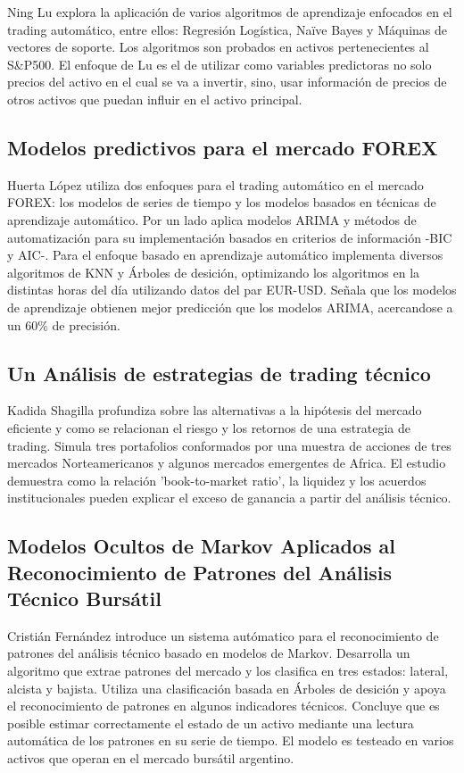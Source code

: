 \documentclass[a4paper,12pt]{Latex/Classes/PhDthesisPSnPDF}
\begin{document}
Ning Lu explora la aplicación de varios algoritmos de aprendizaje enfocados en el trading automático, entre ellos: Regresión Logística, Naïve Bayes y Máquinas de vectores de soporte. Los algoritmos son probados en activos pertenecientes al S\&P500. El enfoque de Lu es el de utilizar como variables predictoras no solo precios del activo en el cual se va a invertir, sino, usar información de precios de otros activos que puedan influir en el activo principal.

\subsection{Modelos predictivos para el mercado FOREX}

Huerta López utiliza dos enfoques para el trading automático en el mercado FOREX: los modelos de series de tiempo y los modelos basados en técnicas de aprendizaje automático. Por un lado aplica modelos ARIMA y métodos de automatización para su implementación basados en criterios de información -BIC y AIC-. Para el enfoque basado en aprendizaje automático implementa diversos algoritmos de KNN y Árboles de desición, optimizando los algoritmos en la distintas horas del día utilizando datos del par EUR-USD. Señala que los modelos de aprendizaje obtienen mejor predicción que los modelos ARIMA, acercandose a un 60\% de precisión.

\subsection{Un Análisis de estrategias de trading técnico}

Kadida Shagilla profundiza sobre las alternativas a la hipótesis del mercado eficiente y como se relacionan el riesgo y los retornos de una estrategia de trading. Simula tres portafolios conformados por una muestra de acciones de tres mercados Norteamericanos y algunos mercados emergentes de Africa. El estudio demuestra como la relación 'book-to-market ratio', la liquidez y los acuerdos institucionales pueden explicar el exceso de ganancia a partir del análisis técnico. 

\subsection{Modelos Ocultos de Markov Aplicados al Reconocimiento de Patrones del Análisis Técnico Bursátil}

Cristián Fernández introduce un sistema autómatico para el reconocimiento de patrones del análisis técnico basado en modelos de Markov. Desarrolla un algoritmo que extrae patrones del mercado y los clasifica en tres estados: lateral, alcista y bajista. Utiliza una clasificación basada en Árboles de desición y apoya el reconocimiento de patrones en algunos indicadores técnicos. Concluye que es posible estimar correctamente el estado de un activo mediante una lectura automática de los patrones en su serie de tiempo. El modelo es testeado en varios activos que operan en el mercado bursátil argentino.
\end{document}
